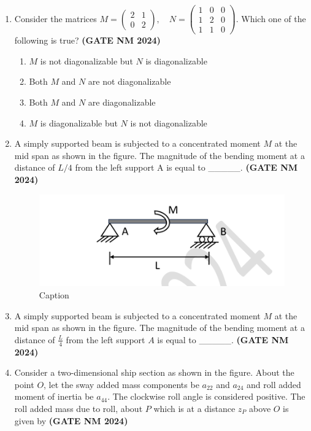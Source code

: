 \documentclass[journal,15pt,onecolumn]{IEEEtran}
\theoremstyle{remark}
\begin{document}
\begin{enumerate}
 \item Consider the matrices 
    $ M = \begin{pmatrix} 2 & 1 \\ 0 & 2 \end{pmatrix}, \quad 
    N = \begin{pmatrix} 1 & 0 & 0 \\ 1 & 2 & 0 \\ 1 & 1 & 0 \end{pmatrix}. 
    $
    Which one of the following is true?\hfill \textbf{ (GATE NM 2024)}
    \begin{enumerate}
        \item $M$ is not diagonalizable but $N$ is diagonalizable
        \item Both $M$ and $N$ are not diagonalizable
        \item Both $M$ and $N$ are diagonalizable
        \item $M$ is diagonalizable but $N$ is not diagonalizable
    \end{enumerate}

\item A simply supported beam is subjected to a concentrated moment $M$ at the mid span as shown in the figure. 
    The magnitude of the bending moment at a distance of $L/4$ from the left support A is equal to \_\_\_\_\_.\hfill \textbf{ (GATE NM 2024)}




\begin{figure}[h!]
    \centering
    \includegraphics[width=0.8\linewidth]{figures.tex/Screenshot 2025-08-21 112803.png}
    \caption{Caption}
    \label{fig:placeholder}
\end{figure}


  \item A simply supported beam is subjected to a concentrated moment $M$ at the mid span as shown in the figure. 
    The magnitude of the bending moment at a distance of $\tfrac{L}{4}$ from the left support $A$ is equal to \_\_\_\_\_.\hfill \textbf{ (GATE NM 2024)}

\item Consider a two-dimensional ship section as shown in the figure. 
    About the point $O$, let the sway added mass components be $a_{22}$ and $a_{24}$ 
    and roll added moment of inertia be $a_{44}$. 
    The clockwise roll angle is considered positive. 
    The roll added mass due to roll, about $P$ which is at a distance $z_P$ above $O$ is given by\hfill \textbf{ (GATE NM 2024)}


\end{enumerate}
\end{document}

